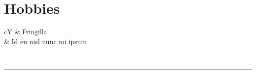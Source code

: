 \documentclass{article}
\begin{document}
{\begin{minipage}[t][\dimexpr\textheight-2\fboxrule-2\fboxsep\relax][t]{\dimexpr0.4\textwidth-2\fboxrule-2\fboxsep\relax}
        \section*{\large Hobbies}
        \begin{tabularx}{\textwidth}{cY}
            \faCamera{} & Fringilla \\
            \faCogs{} & Id eu nisl nunc mi ipsum \\
        \end{tabularx}
        \vspace{.3cm}
        \\
        \rule{\linewidth}{0.4pt}
    \end{minipage}%
}%
\end{document}
